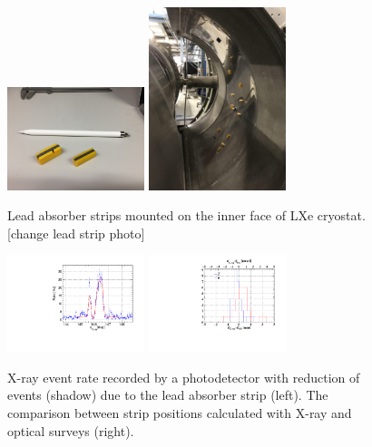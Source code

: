 \begin{figure}[]
\centering
\includegraphics[width=4cm]{plots/lead1}
\includegraphics[width=4cm]{plots/MountedLeadStrips3}
\caption{Lead absorber strips mounted on the inner face
of LXe cryostat. [change lead strip photo]}
\label{fig:lead1} 
\end{figure}
\begin{figure}[]
\includegraphics[width=4cm]{plots/2018/MPPCLeadScan}
\includegraphics[width=4cm]{plots/2018/dzdphi_lead}
\caption{X-ray event rate recorded by a photodetector 
with reduction of events (shadow) due to the lead absorber strip
(left). The  comparison between strip positions calculated
with X-ray and optical surveys (right). }
\label{fig:lead2} 
\end{figure}

